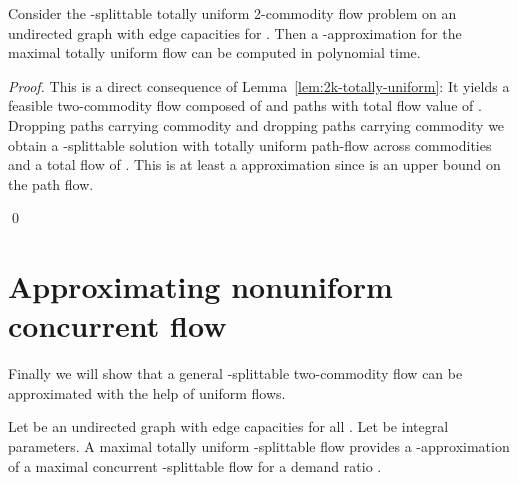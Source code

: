 \begin{theorem}\label{thm:approx-biuniform}
  Consider the
  -splittable totally uniform 2-commodity flow problem on an
  undirected graph   with edge capacities
   for . Then a -approximation for the
  maximal totally uniform flow can be computed in polynomial time.
\end{theorem}


\begin{proof}
  This is a direct consequence of
  Lemma~\ref{lem:2k-totally-uniform}: It yields a feasible
  two-commodity flow composed of  and  paths with total
  flow value of . Dropping  paths carrying
  commodity  and dropping  paths carrying commodity  we
  obtain a -splittable solution with totally uniform
  path-flow across commodities and a total flow of
  . This is at least a 
  approximation since  is an upper bound on the path flow.

\qed \end{proof}

\section{Approximating nonuniform concurrent flow}
\label{sec:appr-nonuniform}

Finally we will show that a general -splittable two-commodity flow
can be approximated with the help of uniform flows.

\begin{theorem}\label{thm:approx-nonuniform}
  Let  be an undirected graph with edge capacities
   for all . Let  be
  integral parameters. A maximal  totally uniform -splittable
  flow provides a -approximation of a maximal concurrent
  -splittable flow for a demand ratio .
\end{theorem}

